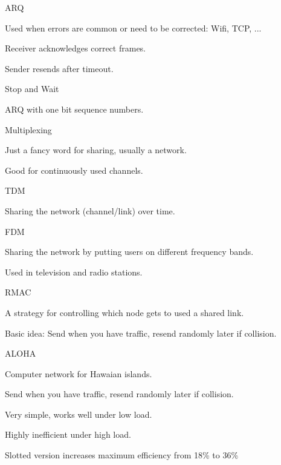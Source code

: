 \documentclass[main.tex]{subfiles}
\begin{document}
\begin{card}{ARQ}
\item Used when errors are common or need to be corrected: Wifi, TCP, ...
\item Receiver acknowledges correct frames.
\item Sender resends after timeout.
\end{card}

\full{}
\begin{card}{Stop and Wait}
\item ARQ with one bit sequence numbers.
\end{card}

\begin{card}{Multiplexing}
\item Just a fancy word for sharing, usually a network.
\item Good for continuously used channels.
\end{card}

\begin{card}{TDM}
\item Sharing the network (channel/link) over time.
\end{card}

\begin{card}{FDM}
\item Sharing the network by putting users on different frequency bands.
\item Used in television and radio stations.
\end{card}

\begin{card}{RMAC}
\item A strategy for controlling which node gets to used a shared link.
\item Basic idea: Send when you have traffic, resend randomly later if collision.
\end{card}

\full{}
\begin{card}{ALOHA}
\item Computer network for Hawaian islands.
\item Send when you have traffic, resend randomly later if collision.
\item Very simple, works well under low load.
\item Highly inefficient under high load.
\item Slotted version increases maximum efficiency from 18\% to 36\%
\end{card}
\end{document}
